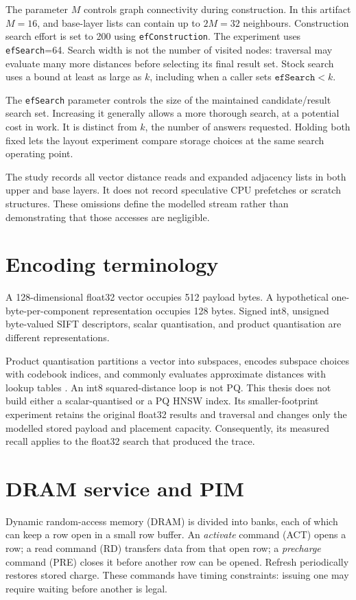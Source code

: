 \documentclass[11pt,a4paper]{report}
\begin{document}
The parameter $M$ controls graph connectivity during construction. In this artifact $M=16$, and base-layer lists can contain up to $2M=32$ neighbours. Construction search effort is set to 200 using \texttt{efConstruction}. The experiment uses \texttt{efSearch}=64. Search width is not the number of visited nodes: traversal may evaluate many more distances before selecting its final result set. Stock search uses a bound at least as large as $k$, including when a caller sets $\texttt{efSearch}<k$.

The \texttt{efSearch} parameter controls the size of the maintained candidate/result search set. Increasing it generally allows a more thorough search, at a potential cost in work. It is distinct from $k$, the number of answers requested. Holding both fixed lets the layout experiment compare storage choices at the same search operating point.

The study records all vector distance reads and expanded adjacency lists in both upper and base layers. It does not record speculative CPU prefetches or scratch structures. These omissions define the modelled stream rather than demonstrating that those accesses are negligible.

\section{Encoding terminology}
A 128-dimensional float32 vector occupies 512 payload bytes. A hypothetical one-byte-per-component representation occupies 128 bytes. Signed int8, unsigned byte-valued SIFT descriptors, scalar quantisation, and product quantisation are different representations.

Product quantisation partitions a vector into subspaces, encodes subspace choices with codebook indices, and commonly evaluates approximate distances with lookup tables \cite{pq}. An int8 squared-distance loop is not PQ. This thesis does not build either a scalar-quantised or a PQ HNSW index. Its smaller-footprint experiment retains the original float32 results and traversal and changes only the modelled stored payload and placement capacity. Consequently, its measured recall applies to the float32 search that produced the trace.

\section{DRAM service and PIM}
Dynamic random-access memory (DRAM) is divided into banks, each of which can keep a row open in a small row buffer. An \emph{activate} command (ACT) opens a row; a read command (RD) transfers data from that open row; a \emph{precharge} command (PRE) closes it before another row can be opened. Refresh periodically restores stored charge. These commands have timing constraints: issuing one may require waiting before another is legal.
\end{document}
